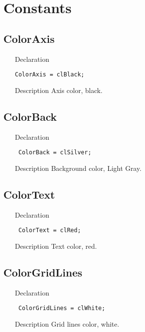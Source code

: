 \documentclass[12pt,a4paper,oneside]{report}
\newcommand{\declarationitem}[1]{{\addfontfeatures{FakeBold=1.3} #1}}
\newcommand{\descriptiontitle}[1]{{\addfontfeatures{FakeSlant}#1}}
\newcommand{\code}[1]{\texttt{#1}}
\begin{document}
\section{Constants}
\subsection*{ColorAxis}
\label{lmcoordsys-ColorAxis}
\begin{itemize}\item[\declarationitem{Declaration}\hfill]
\begin{flushleft}
\code{ColorAxis      =  clBlack;}
\end{flushleft}
\item[\descriptiontitle{Description}]
Axis color, black.
\end{itemize}
\subsection*{ColorBack}
\label{lmcoordsys-ColorBack}
\begin{itemize}\item[\declarationitem{Declaration}\hfill]
\begin{flushleft}
\code{
ColorBack      =  clSilver;}
\end{flushleft}
\item[\descriptiontitle{Description}]
Background color, Light Gray.
\end{itemize}
\subsection*{ColorText}
\label{lmcoordsys-ColorText}
\begin{itemize}\item[\declarationitem{Declaration}\hfill]
\begin{flushleft}
\code{
ColorText      =  clRed;}
\end{flushleft}
\item[\descriptiontitle{Description}]
Text color, red.
\end{itemize}
\subsection*{ColorGridLines}
\label{lmcoordsys-ColorGridLines}
\begin{itemize}\item[\declarationitem{Declaration}\hfill]
\begin{flushleft}
\code{
ColorGridLines = clWhite;}
\end{flushleft}
\item[\descriptiontitle{Description}]
Grid lines color, white.
\end{itemize}
\end{document}
